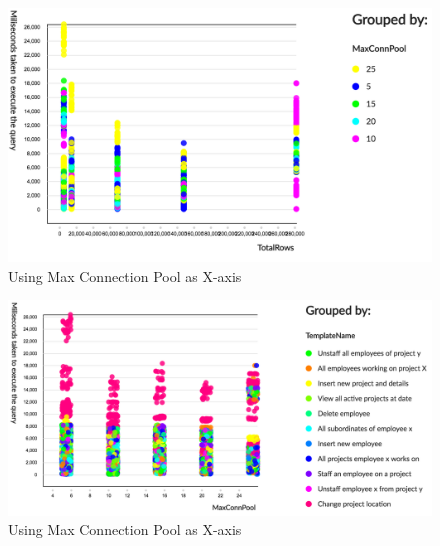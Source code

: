 \documentclass[12pt]{article}
\begin{document}
\begin{spacing}{1.9}
\begin{figure}[H]
	\end{figure}
	\begin{figure}[H]
		\centering
		\includegraphics[width=\textwidth]{maria2-conn.png}
		\caption{Using Max Connection Pool as X-axis }
		
	\end{figure}
	\begin{figure}[H]
		\centering
		\includegraphics[width=\textwidth]{maria2-mcp.png}
		\caption{Using Max Connection Pool as X-axis }
		
	\end{figure}
	
	
\end{spacing}
\end{document}

